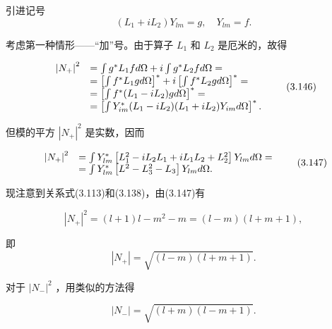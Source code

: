 引进记号
\begin{equation*}
(L _ {1} + i L _ {2}) Y _ {l m} = g, \quad Y _ {l m} = f.
\end{equation*}

考虑第一种情形——“加”号。由于算子 $L_{1}$ 和 $L_{2}$ 是厄米的，故得

\begin{equation*}
\begin{array}{r l} \left| N _ {+} \right| ^ {2} & = \int g ^ {*} L _ {1} f d \Omega + i \int g ^ {*} L _ {2} f d \Omega = \\ & = \left[ \int f ^ {*} L _ {1} g d \Omega \right] ^ {*} + i \left[ \int f ^ {*} L _ {2} g d \Omega \right] ^ {*} = \\ & = \left[ \int f ^ {*} (L _ {1} - i L _ {2}) g d \Omega \right] ^ {*} = \\ & = \left[ \int Y _ {i m} ^ {*} (L _ {1} - i L _ {2}) (L _ {1} + i L _ {2}) Y _ {i m} d \Omega \right] ^ {*}. \end{array}\tag{3.146}
\end{equation*}

但模的平方 $|N_{+}|^{2}$ 是实数，因而

\begin{equation*}
\begin{array}{r l} \left| N _ {+} \right| ^ {2} & = \int Y _ {l m} ^ {*} \left[ L _ {1} ^ {2} - i L _ {2} L _ {1} + i L _ {1} L _ {2} + L _ {2} ^ {2} \right] Y _ {l m} d \Omega = \\ & = \int Y _ {l m} ^ {*} \left[ L ^ {2} - L _ {3} ^ {2} - L _ {3} \right] Y _ {l m} d \Omega . \end{array} \tag{3.147}
\end{equation*}

现注意到关系式(3.113)和(3.138)，由(3.147)有

\begin{equation*}
\left| N _ {+} \right| ^ {2} = (l + 1) l - m ^ {2} - m = (l - m) (l + m + 1),
\end{equation*}

即
\begin{equation*}
\left| N _ {+} \right| = \sqrt {(l - m) (l + m + 1)}.
\end{equation*}

对于 $|N_{-}|^{2}$ ，用类似的方法得

\begin{equation*}
\left| N _ {-} \right| = \sqrt {(l + m) (l - m + 1)}.
\end{equation*}


